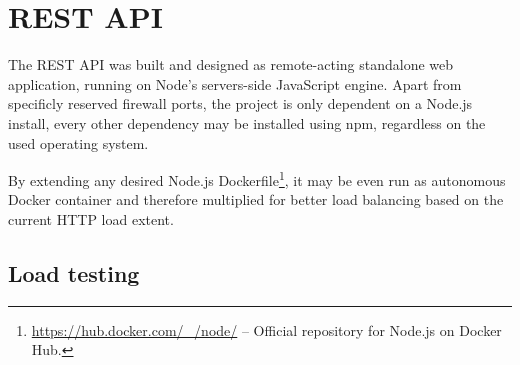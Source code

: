 \section{REST API}
\label{sec:restapi}
The REST API was built and designed as remote-acting standalone web application, running on Node's servers-side JavaScript engine. Apart from specificly reserved firewall ports, the project is only dependent on a Node.js install, every other dependency may be installed using npm, regardless on the used operating system.

By extending any desired Node.js Dockerfile\footnote{\url{https://hub.docker.com/_/node/} -- Official repository for Node.js on Docker Hub.}, it may be even run as autonomous Docker container and therefore multiplied for better load balancing based on the current HTTP load extent.

\subsection{Load testing}
